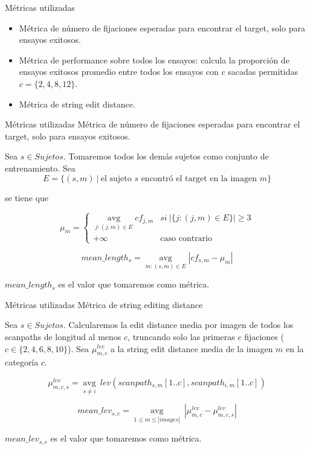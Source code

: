 \documentclass[compress]{beamer}
\DeclareMathOperator*{\avg}{avg}
\begin{document}
\begin{frame}{Métricas utilizadas}
\begin{itemize}
\item Métrica de número de fijaciones esperadas para
encontrar el target, solo para ensayos exitosos.
\item Métrica de performance sobre todos los ensayos: calcula la proporción de ensayos exitosos promedio entre todos los ensayos con $c$ sacadas permitidas $c = \{2,4,8,12\}$.
\item Métrica de string edit distance.
\end{itemize}
\end{frame}

\begin{frame}{Métricas utilizadas}
{Métrica de número de fijaciones esperadas para
encontrar el target, solo para ensayos exitosos.}

Sea $s \in Sujetos$. Tomaremos todos los demás sujetos como conjunto de entrenamiento. Sea $$ E = \{(s,m) \ | \ \text{el sujeto $s$ encontró el target en la imagen $m$}\}$$

se tiene que

$$ \mu_m
= \left\{ \begin{array}{lc}
             \avg\limits_{j:(j,m) \in E} cf_{j,m} &  si \ |\{j:(j,m) \in E\}| \geq 3 \\
             +\infty &  \text{caso contrario}
          \end{array}
   \right.$$

$$mean\_length_s = \avg\limits_{m:(s,m) \in E} |cf_{s,m} - \mu_m| $$

$mean\_length_s$ es el valor que tomaremos como métrica.
\end{frame}

\begin{frame}{Métricas utilizadas}
{Métrica de string editing distance}

Sea $s \in Sujetos$. Calcularemos la edit distance media por imagen de todos los scanpaths de longitud al menos $c$, truncando solo las primeras $c$ fijaciones ($c \in \{2,4,6,8,10\}$). Sea $\mu_{m,c}^{lev}$ a la string edit distance media de la imagen $m$ en la categoría $c$.

$$\mu_{m,c,s}^{lev} = \avg\limits_{s \neq i} \ lev(scanpath_{s,m}[1..c], scanpath_{i,m}[1..c])$$

$$mean\_lev_{s,c} = \avg\limits_{1 \leq m \leq |images|} \ |\mu_{m,c}^{lev} - \mu_{m,c,s}^{lev}|$$

$mean\_lev_{s,c}$ es el valor que tomaremos como métrica.
\end{frame}
\end{document}
